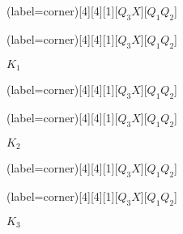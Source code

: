 \documentclass[a4paper,12pt]{article}
\begin{document}
\begin{figure}[H]
	\begin{minipage}{0.5\linewidth}
		\centering
		\begin{karnaugh-map}(label=corner)[4][4][1][$Q_3X$][$Q_1Q_2$]
			\autoterms[X]
		\end{karnaugh-map}
		\caption*{$J_1$}
	\end{minipage}
	\begin{minipage}{0.5\linewidth}
		\centering
		\begin{karnaugh-map}(label=corner)[4][4][1][$Q_3X$][$Q_1Q_2$]
			\autoterms[X]
		\end{karnaugh-map}
		\caption*{$K_1$}
	\end{minipage}
\end{figure}

\begin{figure}[H]
	\begin{minipage}{0.5\linewidth}
		\centering
		\begin{karnaugh-map}(label=corner)[4][4][1][$Q_3X$][$Q_1Q_2$]
			\autoterms[X]
		\end{karnaugh-map}
		\caption*{$J_2$}
	\end{minipage}
	\begin{minipage}{0.5\linewidth}
		\centering
		\begin{karnaugh-map}(label=corner)[4][4][1][$Q_3X$][$Q_1Q_2$]
			\autoterms[X]
		\end{karnaugh-map}
		\caption*{$K_2$}
	\end{minipage}
\end{figure}

\begin{figure}[H]
	\begin{minipage}{0.5\linewidth}
		\centering
		\begin{karnaugh-map}(label=corner)[4][4][1][$Q_3X$][$Q_1Q_2$]
			\autoterms[X]
		\end{karnaugh-map}
		\caption*{$J_3$}
	\end{minipage}
	\begin{minipage}{0.5\linewidth}
		\centering
		\begin{karnaugh-map}(label=corner)[4][4][1][$Q_3X$][$Q_1Q_2$]
			\autoterms[X]
		\end{karnaugh-map}
		\caption*{$K_3$}
	\end{minipage}
\end{figure}
\end{document}
